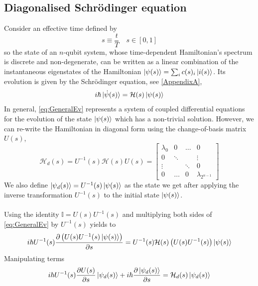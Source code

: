 \subsection{Diagonalised Schrödinger equation}
Consider an effective time defined by
\begin{equation}
    s \equiv \frac{t}{T} \quad s \in [0,1]
\end{equation}
so the state of an $n$-qubit system, whose time-dependent Hamiltonian's spectrum is discrete and non-degenerate, can be written as a linear combination of the instantaneous eigenstates of the Hamiltonian $\ket{\psi(s)} = \sum_{i}c(s)_{i}\ket{i(s)}$. Its evolution is given by the Schrödinger equation, see \ref{AppendixA},
\begin{equation}
\label{eq:GeneralEv}
    i\hbar \ket{\dot{\psi}(s)} = \mathcal{H}(s) \ket{\psi(s)}
\end{equation}
In general, \ref{eq:GeneralEv} represents a system of coupled differential equations for the evolution of the state $\ket{\psi(s)}$ which has a non-trivial solution. However, we can re-write the Hamiltonian in diagonal form using the change-of-basis matrix $U(s)$,
\begin{equation}
    \mathcal{H}_{d}(s) = U^{-1}(s)\mathcal{H}(s)U(s) = \begin{bmatrix}
           \lambda_{0} & 0 & \hdots & 0 \\
           0 &  \ddots & & \vdots \\
           \vdots &   & \ddots & 0 \\
           0 & \hdots & 0 & \lambda_{2^{n-1}}
         \end{bmatrix}
\end{equation}
We also define $\ket{\psi_{d}(s)} = U^{-1}(s)\ket{\psi(s)}$ as the state we get after applying the inverse transformation $U^{-1}(s)$ to the initial state $\ket{\psi(s)}$.\\\\
Using the identity $\mathbb{I} = U(s)U^{-1}(s)$ and multiplying both sides of \ref{eq:GeneralEv} by $U^{-1}(s)$ yields to
\begin{equation}
     i\hbar U^{-1}(s) \frac{\partial \left(U(s)U^{-1}(s)\ket{\psi(s)}\right)}{\partial s} = U^{-1}(s)\mathcal{H}(s) \left(U(s)U^{-1}(s)\right)\ket{\psi(s)}
\end{equation}
Manipulating terms
\begin{equation}
     i\hbar U^{-1}(s) \frac{\partial U(s)}{\partial s}\ket{\psi_{d}(s)} + i\hbar  \frac{\partial \ket{\psi_{d}(s)}}{\partial s}= \mathcal{H}_{d}(s)\ket{\psi_{d}(s)}
\end{equation}
